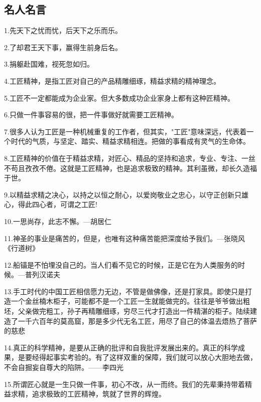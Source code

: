 \documentclass[UTF8]{ctexart}
\begin{document}
\subsection{名人名言}
1.先天下之忧而忧，后天下之乐而乐。\par
2.了却君王天下事，赢得生前身后名。\par
3.捐躯赴国难，视死忽如归。\par
4.工匠精神，是指工匠对自己的产品精雕细琢，精益求精的精神理念。\par
5.工匠不一定都能成为企业家。但大多数成功企业家身上都有这种匠精神。\par
6.只做一件事容易的很，把一件事做好就需要工匠精神。\par
7.很多人认为工匠是一种机械重复的工作者，但其实，"工匠"意味深远，代表着一个时代的气质，与坚定、踏实、精益求精相连。把做的事看成有灵气的生命体。\par
8.工匠精神的价值在于精益求精，对匠心、精品的坚持和追求，专业、专注、一丝不苟且孜孜不倦。这就是工匠精神，也是追求极致的精神。其利虽微，却长久造福于世。\par
9.以精益求精之决心，以持之以恒之耐心，以爱岗敬业之忠心，以守正创新只雄心，得此四心者，可谓之工匠!\par
10.一思尚存，此志不懈。—胡居仁\par
11.神圣的事业是痛苦的，但是，也唯有这种痛苦能把深度给予我们。—张晓风《行道树》\par
12.船锚是不怕埋没自己的。当人们看不见它的时候，正是它在为人类服务的时候。—普列汉诺夫\par
13.手工时代的中国工匠相信愿力无边，不管是做佛像，还是打家具。即使只是打造一个金丝楠木柜子，可能都不是一个工匠一生就能做完的。往往是爷爷做出粗坯，父亲做完粗工，孙子再精雕细琢，穷尽三代才打造出一件精湛的柜子。陆续建造了一千六百年的莫高窟，那是多少代无名工匠，用尽了自己的体温去焐热了菩萨的慈悲\par
14.真正的科学精神，是要从正确的批评和自我批评发展出来的。真正的科学成果，是要经得起事实考验的。有了这样双重的保障，我们就可以放心大胆地去做，不会自掘妄自尊大的陷阱。——李四光\par
15.所谓匠心就是一生只做一件事，初心不改，从一而终。我们的先辈秉持带着精益求精，追求极致的工匠精神，筑就了世界的辉煌。\par
\end{document}
